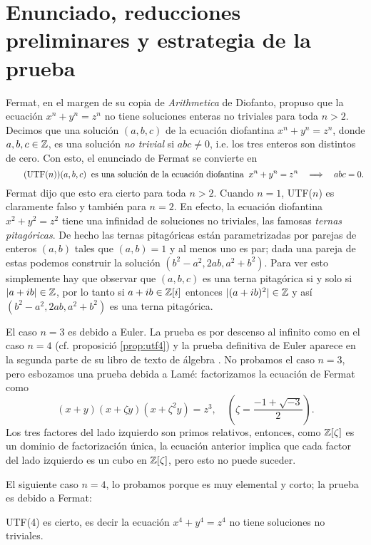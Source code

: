 \section{Enunciado, reducciones preliminares y estrategia de la prueba}

Fermat, en el margen de su copia de \emph{Arithmetica} de Diofanto, propuso que la ecuación $x^n+y^n=z^n$ no tiene soluciones enteras no triviales para toda $n>2$. Decimos que una solución $(a,b,c)$ de la ecuación diofantina $x^n+y^n=z^n$, donde $a,b,c\in\mathbb{Z}$, es una solución \emph{no trivial} si $abc\neq0$, i.e. los tres enteros son distintos de cero. Con esto, el enunciado de Fermat se convierte en
\begin{equation}\label{utfn-fermat}\tag{UTF($n$)}
	(a,b,c)\;\;\text{es una solución de la ecuación diofantina}\;\; x^n+y^n=z^n\quad\Longrightarrow\quad abc=0.
\end{equation}
Fermat dijo que esto era cierto para toda $n>2$. Cuando $n=1$, UTF($n$) es claramente falso y también para $n=2$. En efecto, la ecuación diofantina $x^2+y^2=z^2$ tiene una infinidad de soluciones no triviales, las famosas \emph{ternas pitagóricas}. De hecho las ternas pitagóricas están parametrizadas por parejas de enteros $(a,b)$ tales que $(a,b)=1$ y al menos uno es par; dada una pareja de estas podemos construir la solución $(b^2-a^2,2ab,a^2+b^2)$. Para ver esto simplemente hay que observar que $(a,b,c)$ es una terna pitagórica si y solo si $|a+ib|\in\mathbb{Z}$, por lo tanto si $a+ib\in\mathbb{Z}[i]$ entonces $|(a+ib)^2|\in\mathbb{Z}$ y así $(b^2-a^2,2ab,a^2+b^2)$ es una terna pitagórica.

El caso $n=3$ es debido a Euler. La prueba es por descenso al infinito como en el caso $n=4$ (cf. proposició \ref{prop:utf4}) y la prueba definitiva de Euler aparece en la segunda parte de su libro de texto de álgebra \cite[capítulo XV]{EulerAlgebra}. No probamos el caso $n=3$, pero esbozamos una prueba debida a Lamé: factorizamos la ecuación de Fermat como
\[
	(x+y)(x+\zeta y)(x+\zeta^2 y)=z^3,\quad\left(\zeta=\frac{-1+\sqrt{-3}}{2} \right).
\]
Los tres factores del lado izquierdo son primos relativos, entonces, como $\mathbb{Z}[\zeta]$ es un dominio de factorización única, la ecuación anterior implica que cada factor del lado izquierdo es un cubo en $\mathbb{Z}[\zeta]$, pero esto no puede suceder.

El siguiente caso $n=4$, lo probamos porque es muy elemental y corto; la prueba es debido a Fermat:

\begin{prop}\label{prop:utf4}
	UTF(4) es cierto, es decir la ecuación $x^4+y^4=z^4$ no tiene soluciones no triviales.
\end{prop}

